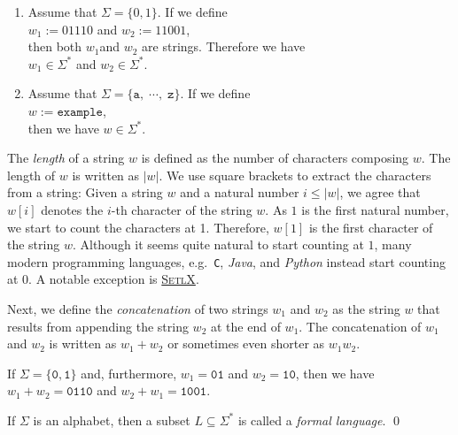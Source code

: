 \examplesEng
\begin{enumerate}
\item Assume that $\Sigma = \{0, 1\}$.  If we define
      \\[0.2cm]
      \hspace*{1.3cm}
      $w_1 := 01110$ \quad and \quad $w_2 := 11001$,
      \\[0.2cm]
      then both $w_1$and $w_2$ are strings.  Therefore we have
      \\[0.2cm]
      \hspace*{1.3cm}
      $w_1 \in \Sigma^*$ \quad and \quad $w_2 \in \Sigma^*$.
\item Assume that $\Sigma = \{\mathtt{a}, \;\cdots\!,\; \mathtt{z}\}$.   If we define
      \\[0.2cm]
      \hspace*{1.3cm}
      $w := \mathtt{example}$,
      \\[0.2cm]
      then we have $w \in \Sigma^*$. \eox
\end{enumerate}
The \emph{length} of a string $w$ is defined as the number of characters composing $w$.
The length of $w$ is written as $|w|$.  We use square brackets to extract the characters from a string:
Given a string $w$ and a natural number $i \leq |w|$, we agree that $w[i]$ denotes the $i$-th
character of the string $w$.   As $1$ is the first natural number, we start to count the characters at 1.  
Therefore,  $w[1]$ is the first character of the string $w$.  Although it seems quite natural to
start counting at $1$, many modern programming languages, e.g.~\texttt{C}, \textsl{Java}, and
\textsl{Python} instead start counting at $0$.  A notable exception is 
\href{http://randoom.org/Software/SetlX}{\textsc{SetlX}}.

Next, we define the \emph{concatenation} of two strings $w_1$ and $w_2$ as the string $w$ that
results from appending the string $w_2$ at the end of  $w_1$.  The concatenation of $w_1$ and $w_2$
is written as $w_1 + w_2$ or sometimes even shorter as $w_1w_2$.  
\vspace*{0.3cm}

\exampleEng
If $\Sigma = \{\mathtt{0},\mathtt{1}\}$ and, furthermore,  $w_1 = \mathtt{01}$ and $w_2 =
\mathtt{10}$, then we have
\\[0.2cm]
\hspace*{1.3cm}
$w_1+w_2 = \mathtt{0110}$ \quad and \quad $w_2+w_1 = \mathtt{1001}$.  \eox


\begin{Definition} \hspace*{\fill} \linebreak
If $\Sigma$ is an alphabet, then a subset $L \subseteq \Sigma^*$
is called a \emph{formal language}.  \qed
\end{Definition}

